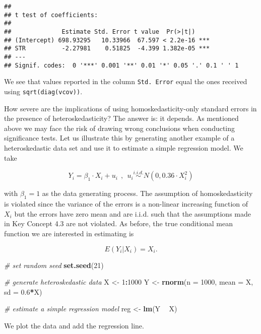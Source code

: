 \documentclass[]{book}
\newenvironment{Shaded}{\begin{snugshade}}{\end{snugshade}}
\newcommand{\KeywordTok}[1]{\textcolor[rgb]{0.13,0.29,0.53}{\textbf{#1}}}
\newcommand{\DataTypeTok}[1]{\textcolor[rgb]{0.13,0.29,0.53}{#1}}
\newcommand{\DecValTok}[1]{\textcolor[rgb]{0.00,0.00,0.81}{#1}}
\newcommand{\FloatTok}[1]{\textcolor[rgb]{0.00,0.00,0.81}{#1}}
\newcommand{\StringTok}[1]{\textcolor[rgb]{0.31,0.60,0.02}{#1}}
\newcommand{\CommentTok}[1]{\textcolor[rgb]{0.56,0.35,0.01}{\textit{#1}}}
\newcommand{\OperatorTok}[1]{\textcolor[rgb]{0.81,0.36,0.00}{\textbf{#1}}}
\newcommand{\NormalTok}[1]{#1}
\theoremstyle{definition}
\theoremstyle{definition}
\theoremstyle{definition}
\theoremstyle{remark}
\begin{document}
\begin{verbatim}
## 
## t test of coefficients:
## 
##              Estimate Std. Error t value  Pr(>|t|)    
## (Intercept) 698.93295   10.33966  67.597 < 2.2e-16 ***
## STR          -2.27981    0.51825  -4.399 1.382e-05 ***
## ---
## Signif. codes:  0 '***' 0.001 '**' 0.01 '*' 0.05 '.' 0.1 ' ' 1
\end{verbatim}

We see that values reported in the column \texttt{Std.\ Error} equal the
ones received using \texttt{sqrt(diag(vcov))}.

How severe are the implications of using homoskedasticity-only standard
errors in the presence of heteroskedasticity? The answer is: it depends.
As mentioned above we may face the risk of drawing wrong conclusions
when conducting significance tests. Let us illustrate this by generating
another example of a heteroskedastic data set and use it to estimate a
simple regression model. We take

\[ Y_i = \beta_1 \cdot X_i + u_i \ \ , \ \ u_i \overset{i.i.d.}{\sim} N(0,0.36 \cdot X_i^2)  \]

with \(\beta_1=1\) as the data generating process. The assumption of
homoskedasticity is violated since the variance of the errors is a
non-linear increasing function of \(X_i\) but the errors have zero mean
and are i.i.d. such that the assumptions made in Key Concept 4.3 are not
violated. As before, the true conditional mean function we are
interested in estimating is

\[ E(Y_i\vert X_i) = X_i. \]

\begin{Shaded}
\begin{Highlighting}[]
\CommentTok{# set random seed}
\KeywordTok{set.seed}\NormalTok{(}\DecValTok{21}\NormalTok{)}

\CommentTok{# generate heteroskedastic data }
\NormalTok{X <-}\StringTok{ }\DecValTok{1}\OperatorTok{:}\DecValTok{1000}
\NormalTok{Y <-}\StringTok{ }\KeywordTok{rnorm}\NormalTok{(}\DataTypeTok{n =} \DecValTok{1000}\NormalTok{, }\DataTypeTok{mean =}\NormalTok{ X, }\DataTypeTok{sd =} \FloatTok{0.6}\OperatorTok{*}\NormalTok{X)}

\CommentTok{# estimate a simple regression model}
\NormalTok{reg <-}\StringTok{ }\KeywordTok{lm}\NormalTok{(Y }\OperatorTok{~}\StringTok{ }\NormalTok{X)}
\end{Highlighting}
\end{Shaded}

We plot the data and add the regression line.
\end{document}
